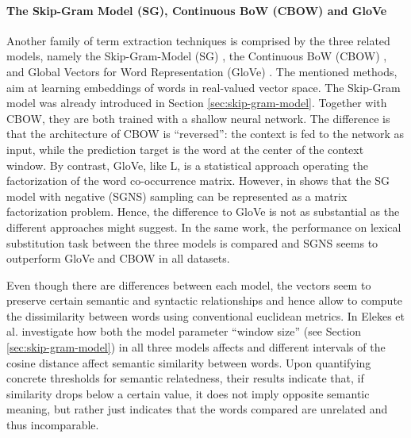 \paragraph{The Skip-Gram Model (SG), Continuous BoW (CBOW) and GloVe} 
\label{par:word-embeddings}
Another family of term extraction techniques is comprised by the three related
models, namely the Skip-Gram-Model (SG) \cite{mikolov2013distributed}, the Continuous
BoW (CBOW) \cite{mikolov2013efficient}, and Global Vectors for Word
Representation (GloVe) \cite{Pennington2014}. The mentioned methods, aim at
learning embeddings of words in real-valued vector space. The Skip-Gram model
was already introduced in Section \ref{sec:skip-gram-model}.
Together with CBOW, they are both trained with a shallow neural network.
The difference is that the architecture of CBOW is ``reversed'': the context is
fed to the network as input, while the prediction target is the word at the
center of the context window. By contrast, GloVe, like L, is a statistical
approach operating the factorization of the word co-occurrence matrix. However,
in \cite{Levy2015} shows that the SG model with negative (SGNS) sampling can be
represented as a matrix factorization problem. Hence, the difference to GloVe
is not as substantial as the different approaches might suggest. In the same
work, the performance on lexical substitution task between the three
models is compared and SGNS seems to outperform GloVe and CBOW in all datasets.

Even though there are differences between each model, the vectors seem
to preserve certain semantic and syntactic relationships and hence allow to compute 
the dissimilarity between words using conventional euclidean metrics. In
\cite{elekesvarious} Elekes et al. investigate how both the model parameter 
``window size'' (see Section \ref{sec:skip-gram-model}) in all three models
affects and different intervals of the cosine distance affect semantic 
similarity between words. Upon quantifying concrete thresholds for semantic
relatedness, their results indicate that, if similarity drops below a certain
value, it does not imply opposite semantic meaning, but rather just indicates
that the words compared are unrelated and thus incomparable. 

